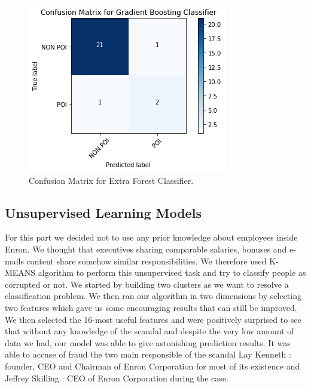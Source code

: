 \documentclass[11pt]{article}
\begin{document}
\begin{figure}[htbp]
  \centering
  \includegraphics[width=\columnwidth]{images/confusion_matrix.png}
  \vspace{-7mm}
  \caption{Confusion Matrix for Extra Forest Classifier.}
  \vspace{-3mm}
  \label{fig:confusion}
\end{figure}

\subsection{Unsupervised Learning Models}
For this part we decided not to use any prior knowledge about employees inside Enron. We thought that executives sharing comparable salaries, bonuses and e-mails content share somehow similar responsibilities.  We therefore used K-MEANS \cite{kmeans} algorithm to perform this unsupervised task and try to classify people as corrupted or not.
We started by building two clusters as we want to resolve a classification problem. We then ran our algorithm in two dimensions by selecting two features which gave us some encouraging results that can still be improved.  We then selected the 16-most useful  features and were positively surprised to see that without any knowledge of the scandal and despite the very low amount of data we had, our model was able to give astonishing prediction results. It was able to accuse of fraud the two main responsible of the scandal Lay Kenneth : founder, CEO and Chairman of Enron Corporation for most of its existence and Jeffrey Skilling : CEO of Enron Corporation during the case.
\end{document}
